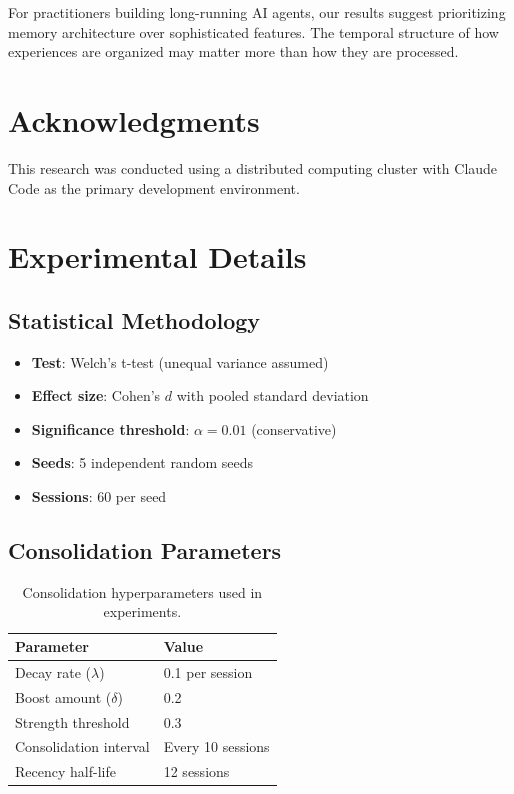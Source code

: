 \documentclass[11pt]{article}
\begin{document}
For practitioners building long-running AI agents, our results suggest prioritizing memory architecture over sophisticated features. The temporal structure of how experiences are organized may matter more than how they are processed.

\section*{Acknowledgments}

This research was conducted using a distributed computing cluster with Claude Code as the primary development environment.




\appendix

\section{Experimental Details}

\subsection{Statistical Methodology}

\begin{itemize}
    \item \textbf{Test}: Welch's t-test (unequal variance assumed)
    \item \textbf{Effect size}: Cohen's $d$ with pooled standard deviation
    \item \textbf{Significance threshold}: $\alpha = 0.01$ (conservative)
    \item \textbf{Seeds}: 5 independent random seeds
    \item \textbf{Sessions}: 60 per seed
\end{itemize}

\subsection{Consolidation Parameters}

\begin{table}[h]
\centering
\begin{tabular}{@{}ll@{}}
\toprule
Parameter & Value \\
\midrule
Decay rate ($\lambda$) & 0.1 per session \\
Boost amount ($\delta$) & 0.2 \\
Strength threshold & 0.3 \\
Consolidation interval & Every 10 sessions \\
Recency half-life & 12 sessions \\
\bottomrule
\end{tabular}
\caption{Consolidation hyperparameters used in experiments.}
\end{table}
\end{document}
